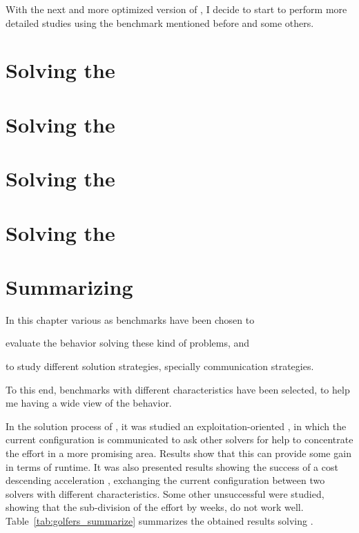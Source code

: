With the next and more optimized version of \posl{}, I decide to start to perform more detailed studies using the benchmark mentioned before and some others.

\section{Solving the \sgp}\label{sec:golfers}


\section{Solving the \nqp}\label{sec:nqueens}


\section{Solving the \carrp}\label{sec:costas}


\section{Solving the \grp}\label{sec:golomb}


\section{Summarizing}

In this chapter various \CSPs{} as benchmarks have been chosen to \begin{inparaenum}[1.] \item evaluate the \posl{} behavior solving these kind of problems, and \item to study different solution strategies, specially communication strategies. \end{inparaenum} To this end, benchmarks with different characteristics have been selected, to help me having a wide view of the \posl{} behavior.

In the solution process of \sgp{}, it was studied an exploitation-oriented \commstr, in which the current configuration is communicated to ask other solvers for help to concentrate the effort in a more promising area. Results show that this \commstr{} can provide some gain in terms of runtime. It was also presented results showing the success of a cost descending acceleration \commstr, exchanging the current configuration between two solvers with different characteristics. Some other unsuccessful \commstrs{} were studied, showing that the sub-division of the effort by weeks, do not work well. Table~\ref{tab:golfers_summarize} summarizes the obtained results solving \SGP. 

